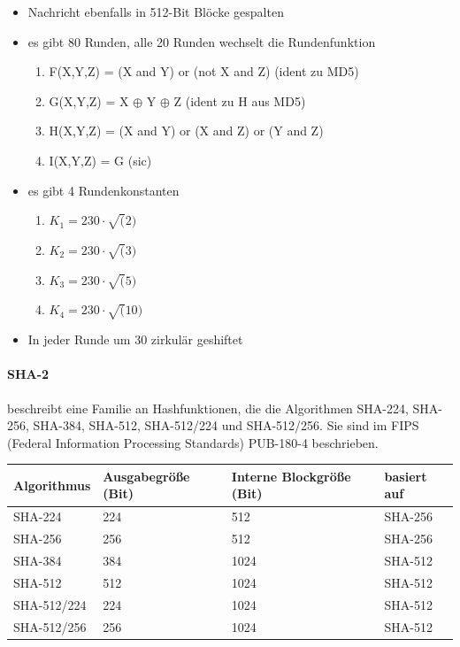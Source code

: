 \begin{itemize}
    \item Nachricht ebenfalls in 512-Bit Blöcke gespalten
    \item es gibt 80 Runden, alle 20 Runden wechselt die Rundenfunktion
    \begin{enumerate}
        \item F(X,Y,Z) = (X and Y) or (not X and Z) (ident zu MD5)
        \item G(X,Y,Z) = X $\oplus$ Y $\oplus$ Z (ident zu H aus MD5)
        \item H(X,Y,Z) = (X and Y) or (X and Z) or (Y and Z)
        \item I(X,Y,Z) = G (sic)
    \end{enumerate}
    \item es gibt 4 Rundenkonstanten
    \begin{enumerate}
        \item $K_1 = 230 \cdot \sqrt(2)$ 
        \item $K_2 = 230 \cdot \sqrt(3)$
        \item $K_3 = 230 \cdot \sqrt(5)$
        \item $K_4 = 230 \cdot \sqrt(10)$
    \end{enumerate}
    \item In jeder Runde um 30 zirkulär geshiftet
\end{itemize}

\paragraph{SHA-2} beschreibt eine Familie an Hashfunktionen, die die Algorithmen SHA-224, SHA-256, SHA-384, SHA-512, SHA-512/224 und SHA-512/256. Sie sind im FIPS 
(Federal Information Processing Standards) PUB-180-4 beschrieben.


\begin{center}
    \begin{tabular}{ llll } 
        \hline
        Algorithmus & Ausgabegröße (Bit) & Interne Blockgröße (Bit) & basiert auf \\ 
        \hline
        SHA-224     & 224 &  512 & SHA-256\\
        SHA-256     & 256 &  512 & SHA-256\\
        SHA-384     & 384 & 1024 & SHA-512\\
        SHA-512     & 512 & 1024 & SHA-512\\
        SHA-512/224 & 224 & 1024 & SHA-512\\
        SHA-512/256 & 256 & 1024 & SHA-512\\
        \hline
    \end{tabular}
\end{center}

